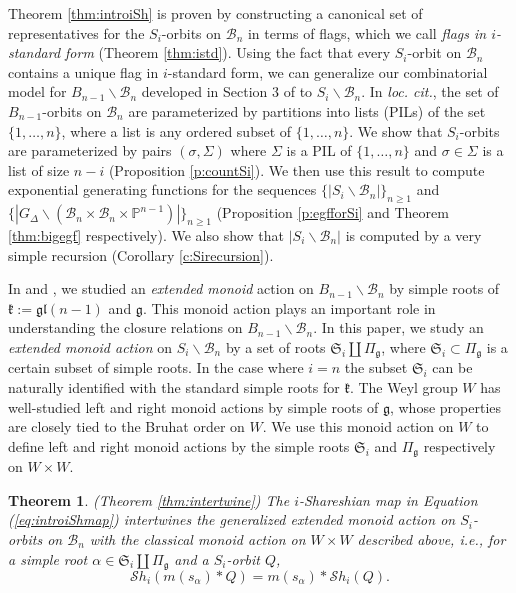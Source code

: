 \documentclass[12pt]{amsart}
\numberwithin{equation}{section}
\newtheorem{thm}{Theorem}[section]
\theoremstyle{remark}
\theoremstyle{definition}
\newcommand{\fk}{\mbox{${\mathfrak k}$}}
\newcommand{\fg}{\mbox{${\mathfrak g}$}}
\newcommand{\fgl}{\mathfrak{gl}}
\newcommand{\B}{\mathcal{B}}
\newcommand{\ms}{m(s_{\alpha})}
\newcommand{\Borbitspace}{B_{n-1}\backslash\B_{n}}
\newcommand{\Sh}{\mathcal{S}h}
\begin{document}
Theorem \ref{thm:introiSh} is proven by constructing a canonical set of representatives for the $S_{i}$-orbits on $\B_{n}$ in terms of flags, which we call \emph{flags in $i$-standard form} (Theorem \ref{thm:istd}).  Using the fact that every $S_{i}$-orbit on $\B_{n}$ contains a unique flag in $i$-standard form, we can generalize our combinatorial model for $\Borbitspace$ developed in Section 3 of \cite{CE21II} to $S_{i}\backslash\B_{n}$.  In \emph{loc. cit.}, the set of $B_{n-1}$-orbits on $\B_{n}$ are parameterized by partitions into lists (PILs) of the set $\{1,\dots, n\}$, where a list is any ordered subset of $\{1,\dots, n\}$.  We show that 
$S_{i}$-orbits are parameterized by pairs $(\sigma,\Sigma)$ where $\Sigma$ is a PIL of $\{1,\dots, n\}$ and $\sigma\in \Sigma$ is a list of size $n-i$ (Proposition \ref{p:countSi}).  We then use this result to compute exponential generating functions for the sequences $\{|S_{i}\backslash \B_{n}|\}_{n\geq 1}$ and $\{|G_{\Delta}\backslash(\B_{n}\times\B_{n}\times\mathbb{P}^{n-1})|\}_{n\geq 1}$ (Proposition \ref{p:egfforSi} and Theorem \ref{thm:bigegf} respectively).  We also show that $|S_{i}\backslash\B_{n}|$ is computed by a very simple recursion (Corollary \ref{c:Sirecursion}). 

In \cite{CE21I} and \cite{CE21II}, we studied an \emph{extended monoid} action on $\Borbitspace$ by simple roots of $\fk:=\fgl(n-1)$ and $\fg$.  This monoid action plays an important role in understanding the closure relations on $B_{n-1}\backslash\B_{n}$.  In this paper, we study an \emph{extended monoid action} on $S_{i}\backslash \B_{n}$ by a set of roots $\mathfrak{S}_i\coprod \Pi_{\fg}$, where $\mathfrak{S}_i\subset \Pi_{\fg}$ is a certain subset of simple roots.  In the case where $i=n$ the subset $\mathfrak{S}_i$ can be naturally identified with the standard simple roots for $\fk$.   The Weyl group $W$ has well-studied left and right monoid actions by simple roots of $\fg$, whose properties are closely tied to the Bruhat order on $W$.  We use this monoid action on $W$ to define left and right monoid actions by the simple roots $\mathfrak{S}_i$ and $\Pi_{\fg}$ respectively on $W\times W$.
\begin{thm}\label{thm:intromonoid}(Theorem \ref{thm:intertwine})
 The $i$-Shareshian map in Equation (\ref{eq:introiShmap}) intertwines the generalized extended monoid action on $S_{i}$-orbits on $\B_{n}$ with the classical monoid action on $W\times W$ described above, i.e., for a simple root $\alpha\in \mathfrak{S}_i\coprod\Pi_{\fg}$ and a $S_{i}$-orbit $Q$, 
 \begin{equation}\label{eq:intromonoids}
 \Sh_{i}(\ms*Q)=\ms*\Sh_{i}(Q).
 \end{equation}
 \end{thm}
\end{document}
